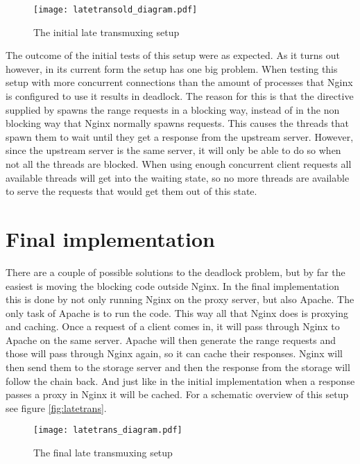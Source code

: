 \documentclass[twoside,openright]{uva-bachelor-thesis}
\begin{document}
\begin{figure}
    \texttt{[image: latetransold\_diagram.pdf]}
    \caption{The initial late transmuxing setup}\label{fig:latetransold}
\end{figure}

\label{par:deadlock}
The outcome of the initial tests of this setup were as expected. As it turns out
however, in its current form the setup has one big problem. When testing this
setup with more concurrent connections than the amount of processes that
Nginx is configured to use it results in deadlock. The reason for this is that the
\ipplong directive supplied by \usp spawns the range requests in a blocking way,
instead of in the non blocking way that Nginx normally spawns requests. This
causes the threads that spawn them to wait until they get a response from the
upstream server. However, since the upstream server is the same server, it will
only be able to do so when not all the threads are blocked. When using enough
concurrent client requests all available threads will get into the waiting
state, so no more threads are available to serve the requests that would get
them out of this state.

\section{Final implementation}
There are a couple of possible solutions to the deadlock problem, but by far the
easiest is moving the blocking code outside Nginx. In the final implementation
this is done by not only running Nginx on the proxy server, but also Apache. The
only task of Apache is to run the \ipplong code. This way all that Nginx does is
proxying and caching. Once a request of a client comes in, it will pass
through Nginx to Apache on the same server. Apache will then generate the range
requests and those will pass through Nginx again, so it can cache their
responses. Nginx will then send them to the storage server and then the response
from the storage will follow the chain back. And just like in the initial
implementation when a response passes a proxy in Nginx it will be cached. For a
schematic overview of this setup see figure \vref{fig:latetrans}.


\begin{figure}
    \texttt{[image: latetrans\_diagram.pdf]}
    \caption{The final late transmuxing setup}\label{fig:latetrans}
\end{figure}
\end{document}
